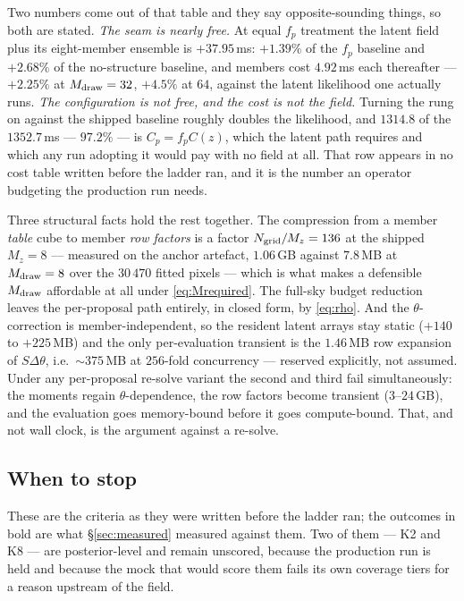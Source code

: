 \documentclass[11pt]{article}
\theoremstyle{definition}
\theoremstyle{remark}
\newcommand{\Mdraw}{M_{\rm draw}}
\newcommand{\Mz}{M_{z}}
\begin{document}
\noindent Two numbers come out of that table and they say opposite-sounding
things, so both are stated. \emph{The seam is nearly free.} At equal $f_p$
treatment the latent field plus its eight-member ensemble is $+37.95$\,ms:
$+1.39\%$ of the $f_p$ baseline and $+2.68\%$ of the no-structure baseline, and
members cost $4.92$\,ms each thereafter --- $+2.25\%$ at $\Mdraw=32$, $+4.5\%$ at
$64$, against the latent likelihood one actually runs. \emph{The configuration is
not free, and the cost is not the field.} Turning the rung on against the shipped
baseline roughly doubles the likelihood, and $1314.8$ of the $1352.7$\,ms ---
$97.2\%$ --- is $C_p=f_pC(z)$, which the latent path requires and which any run
adopting it would pay with no field at all. That row appears in no cost table
written before the ladder ran, and it is the number an operator budgeting the
production run needs.

\noindent Three structural facts hold the rest together. The compression from a
member \emph{table} cube to member \emph{row factors} is a factor
$N_{\rm grid}/\Mz=136$ at the shipped $\Mz=8$ --- measured on the anchor
artefact, $1.06$\,GB against $7.8$\,MB at $\Mdraw=8$ over the $30\,470$ fitted
pixels --- which is what makes a defensible $\Mdraw$ affordable at all under
\eqref{eq:Mrequired}. The full-sky budget reduction leaves the per-proposal path
entirely, in closed form, by \eqref{eq:rho}. And the $\theta$-correction is
member-independent, so the resident latent arrays stay static ($+140$ to
$+225$\,MB) and the only per-evaluation transient is the $1.46$\,MB row expansion
of $S\Delta\theta$, i.e.\ $\sim375$\,MB at $256$-fold concurrency --- reserved
explicitly, not assumed. Under any per-proposal re-solve variant the second and
third fail simultaneously: the moments regain $\theta$-dependence, the row factors
become transient ($3$--$24$\,GB), and the evaluation goes memory-bound before it
goes compute-bound. That, and not wall clock, is the argument against a re-solve.

\subsection{When to stop}

These are the criteria as they were written before the ladder ran; the outcomes
in bold are what \S\ref{sec:measured} measured against them. Two of them --- K2
and K8 --- are posterior-level and remain unscored, because the production run is
held and because the mock that would score them fails its own coverage tiers for
a reason upstream of the field.
\end{document}
